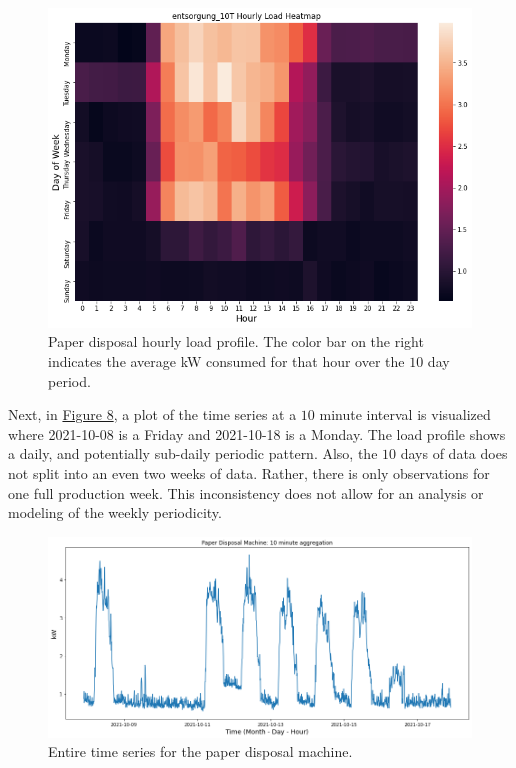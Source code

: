 \begin{figure}[h]
\centering
\graphicspath{ {./images/} }
\includegraphics[scale=0.55]{images/entsorgung_hourly_heatmap.png}
\caption{Paper disposal hourly load profile. The color bar on the right indicates the average kW consumed for that hour over the $10$ day period.}
\end{figure}

Next, in \hyperlink{figure.8}{Figure 8}, a plot of the time series at a $10$ minute interval is visualized where 2021-10-08 is a Friday and 2021-10-18 is a Monday. The load profile shows a daily, and potentially sub-daily periodic pattern. Also, the $10$ days of data does not split into an even two weeks of data. Rather, there is only observations for one full production week. This inconsistency does not allow for an analysis or modeling of the weekly periodicity. 

\begin{figure}[h]
\centering
\graphicspath{ {./images/} }
\includegraphics[scale=0.49]{images/entsorgung_10T_series.png}
\caption{Entire time series for the paper disposal machine.}
\end{figure}

